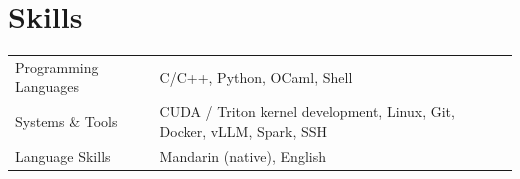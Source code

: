 
\section{Skills}
\begin{tabularx}{\linewidth}{@{}l X@{}}
Programming Languages &  \normalsize{C/C++, Python, OCaml, Shell} \\
Systems \& Tools & \normalsize{CUDA / Triton kernel development, Linux, Git, Docker, vLLM, Spark, SSH} \\
Language Skills &  \normalsize{Mandarin (native), English} \\
\end{tabularx}
